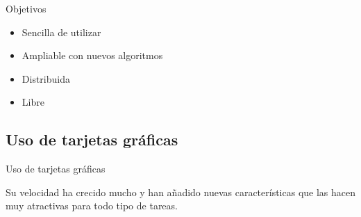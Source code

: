 \documentclass[12pt]{beamer}
\begin{document}
\begin{frame}{Objetivos}
	\begin{itemize}
		\item Sencilla de utilizar
		\item Ampliable con nuevos algoritmos
		\item Distribuida
		\item Libre
	\end{itemize}
\end{frame}

\subsection{Uso de tarjetas gráficas}
\begin{frame}{Uso de tarjetas gráficas}
	\begin{center}
		Su velocidad ha crecido mucho y han añadido nuevas características que las hacen muy atractivas para todo tipo de tareas.
	\end{center}
\end{frame}
\end{document}
